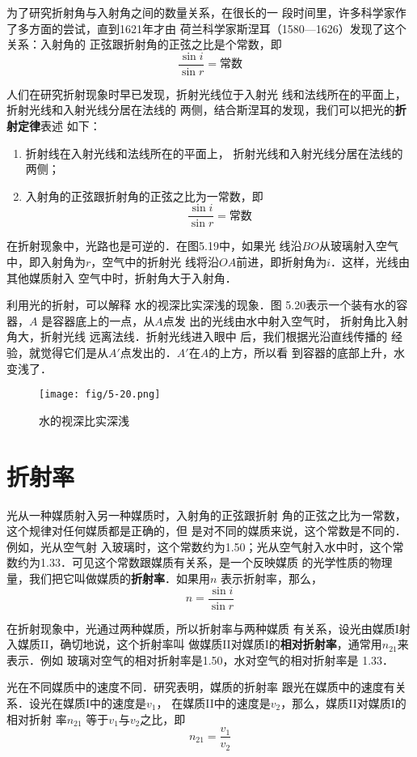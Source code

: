 为了研究折射角与入射角之间的数量关系，在很长的一
段时间里，许多科学家作了多方面的尝试，直到1621年才由
荷兰科学家斯涅耳（1580—1626）发现了这个关系：入射角的
正弦跟折射角的正弦之比是个常数，即
\[\frac{\sin i}{\sin r}=\text{常数}\]

人们在研究折射现象时早已发现，折射光线位于入射光
线和法线所在的平面上，折射光线和入射光线分居在法线的
两侧，结合斯涅耳的发现，我们可以把光的\textbf{折射定律}表述
如下：

\begin{enumerate}
    \item 折射线在入射光线和法线所在的平面上，
折射光线和入射光线分居在法线的两侧；
\item 入射角的正弦跟折射角的正弦之比为一常数，即
\[\frac{\sin i}{\sin r}=\text{常数}\]
\end{enumerate} 

在折射现象中，光路也是可逆的．在图5.19中，如果光
线沿$BO$从玻璃射入空气中，即入射角为$r$，空气中的折射光
线将沿$OA$前进，即折射角为$i$．这样，光线由其他媒质射入
空气中时，折射角大于入射角．

利用光的折射，可以解释
水的视深比实深浅的现象．图
5.20表示一个装有水的容器，$A$
是容器底上的一点，从$A$点发
出的光线由水中射入空气时，
折射角比入射角大，折射光线
远离法线．折射光线进入眼中
后，我们根据光沿直线传播的
经验，就觉得它们是从$A'$点发出的．$A'$在$A$的上方，所以看
到容器的底部上升，水变浅了．
\begin{figure}[htp]\centering
    \texttt{[image: fig/5-20.png]}
    \caption{水的视深比实深浅}
    \end{figure}

\section{折射率} 
    光从一种媒质射入另一种媒质时，入射角的正弦跟折射
    角的正弦之比为一常数，这个规律对任何媒质都是正确的，但
    是对不同的媒质来说，这个常数是不同的．例如，光从空气射
    入玻璃时，这个常数约为1.50；光从空气射入水中时，这个常
    数约为1.33．可见这个常数跟媒质有关系，是一个反映媒质
    的光学性质的物理量，我们把它叫做媒质的\textbf{折射率}．如果用$n$
    表示折射率，那么，
    \[n=\frac{\sin i}{\sin r}\]

    在折射现象中，光通过两种媒质，所以折射率与两种媒质
    有关系，设光由媒质I射入媒质II，确切地说，这个折射率叫
    做媒质II对媒质I的\textbf{相对折射率}，通常用$n_{21}$来表示．例如
    玻璃对空气的相对折射率是1.50，水对空气的相对折射率是
    1.33．

    光在不同媒质中的速度不同．研究表明，媒质的折射率
    跟光在媒质中的速度有关系．设光在媒质I中的速度是$v_1$，
    在媒质II中的速度是$v_2$，那么，媒质II对媒质I的相对折射
    率$n_{21}$
    等于$v_1$与$v_2$之比，即
\[n_{21}=\frac{v_1}{v_2} \]

